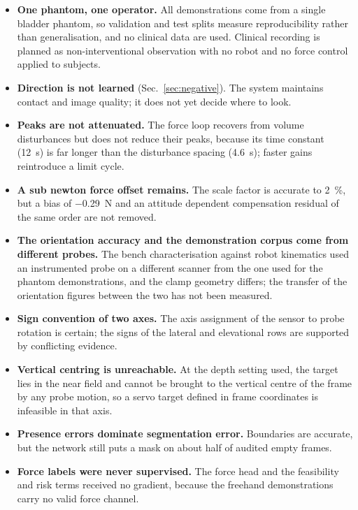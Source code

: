 \documentclass[conference]{IEEEtran}
\begin{document}
\begin{itemize}
\item \textbf{One phantom, one operator.} All demonstrations come from a single
bladder phantom, so validation and test splits measure reproducibility rather
than generalisation, and no clinical data are used. Clinical recording is
planned as non-interventional observation with no robot and no force control
applied to subjects.
\item \textbf{Direction is not learned} (Sec.~\ref{sec:negative}). The system
maintains contact and image quality; it does not yet decide where to look.
\item \textbf{Peaks are not attenuated.} The force loop recovers from volume
disturbances but does not reduce their peaks, because its time constant
(\SI{12}{\second}) is far longer than the disturbance spacing
(\SI{4.6}{\second}); faster gains reintroduce a limit cycle.
\item \textbf{A sub newton force offset remains.} The scale factor is accurate
to \SI{2}{\percent}, but a bias of \SI{-0.29}{\newton} and an attitude dependent
compensation residual of the same order are not removed.
\item \textbf{The orientation accuracy and the demonstration corpus come from
different probes.} The bench characterisation against robot kinematics used an
instrumented probe on a different scanner from the one used for the phantom
demonstrations, and the clamp geometry differs; the transfer of the orientation
figures between the two has not been measured.
\item \textbf{Sign convention of two axes.} The axis assignment of the sensor to
probe rotation is certain; the signs of the lateral and elevational rows are
supported by conflicting evidence.
\item \textbf{Vertical centring is unreachable.} At the depth setting used, the
target lies in the near field and cannot be brought to the vertical centre of
the frame by any probe motion, so a servo target defined in frame coordinates is
infeasible in that axis.
\item \textbf{Presence errors dominate segmentation error.} Boundaries are
accurate, but the network still puts a mask on about half of audited empty
frames.
\item \textbf{Force labels were never supervised.} The force head and the
feasibility and risk terms received no gradient, because the freehand
demonstrations carry no valid force channel.
\end{itemize}
\end{document}

